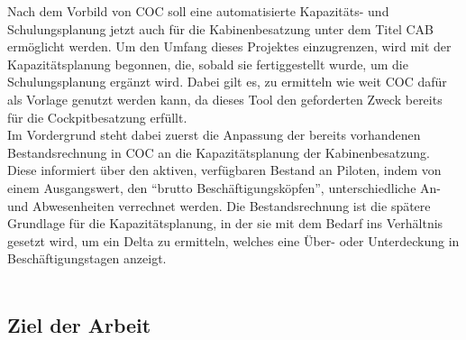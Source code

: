 \documentclass [12pt, a4paper, oneside, titlepage, ngerman]{article}
\begin{document}
\noindent Nach dem Vorbild von \ac{COC} soll eine automatisierte Kapazitäts- und Schulungsplanung jetzt auch für die Kabinenbesatzung unter dem Titel \ac{CAB} ermöglicht werden. Um den Umfang dieses Projektes einzugrenzen, wird mit der Kapazitätsplanung begonnen, die, sobald sie fertiggestellt wurde, um die Schulungsplanung ergänzt wird. Dabei gilt es, zu ermitteln wie weit \ac{COC} dafür als Vorlage genutzt werden kann, da dieses Tool den geforderten Zweck bereits für die Cockpitbesatzung erfüllt.\\
Im Vordergrund steht dabei zuerst die Anpassung der bereits vorhandenen Bestandsrechnung in \ac{COC} an die Kapazitätsplanung der Kabinenbesatzung. Diese informiert über den aktiven, verfügbaren Bestand an Piloten, indem von einem Ausgangswert, den "`brutto Beschäftigungsköpfen"', unterschiedliche An- und Abwesenheiten verrechnet werden. Die Bestandsrechnung ist die spätere Grundlage für die Kapazitätsplanung, in der sie mit dem Bedarf ins Verhältnis gesetzt wird, um ein Delta zu ermitteln, welches eine Über- oder Unterdeckung in Beschäftigungstagen anzeigt.\\ %
\\


\subsection {Ziel der Arbeit} 
\end{document}
